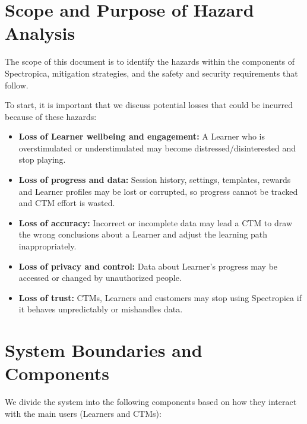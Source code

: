 \documentclass{article}
\begin{document}
\section{Scope and Purpose of Hazard Analysis}

The scope of this document is to identify the hazards within the components of Spectropica, mitigation strategies, and the safety and security requirements that follow.

To start, it is important that we discuss potential losses that could be incurred because of these hazards:

\begin{itemize}
    \item \textbf{Loss of Learner wellbeing and engagement:} A Learner who is overstimulated or understimulated may become distressed/disinterested and stop playing.
    \item \textbf{Loss of progress and data:} Session history, settings, templates, rewards and Learner profiles may be lost or corrupted, so progress cannot be tracked and CTM effort is wasted.
    \item \textbf{Loss of accuracy:} Incorrect or incomplete data may lead a CTM to draw the wrong conclusions about a Learner and adjust the learning path inappropriately.
    \item \textbf{Loss of privacy and control:} Data about Learner's progress may be accessed or changed by unauthorized people.
    \item \textbf{Loss of trust:} CTMs, Learners and customers may stop using Spectropica if it behaves unpredictably or mishandles data.
\end{itemize}

\section{System Boundaries and Components}

We divide the system into the following components based on how they interact with the main users (Learners and CTMs):
\end{document}
